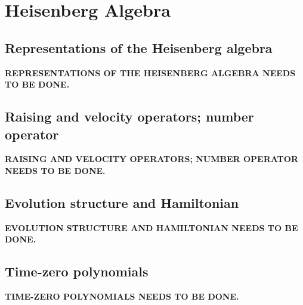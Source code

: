 \chapter{Heisenberg Algebra}
\label{ch:10}
\section{Representations of the Heisenberg algebra}
\label{sec:10-1}

\noindent\textbf{REPRESENTATIONS OF THE HEISENBERG ALGEBRA NEEDS TO BE DONE.}


\section{Raising and velocity operators; number operator}
\label{sec:10-2}

\noindent\textbf{RAISING AND VELOCITY OPERATORS; NUMBER OPERATOR NEEDS TO BE DONE.}


\section{Evolution structure and Hamiltonian}
\label{sec:10-3}

\noindent\textbf{EVOLUTION STRUCTURE AND HAMILTONIAN NEEDS TO BE DONE.}


\section{Time-zero polynomials}
\label{sec:10-4}

\noindent\textbf{TIME-ZERO POLYNOMIALS NEEDS TO BE DONE.}


